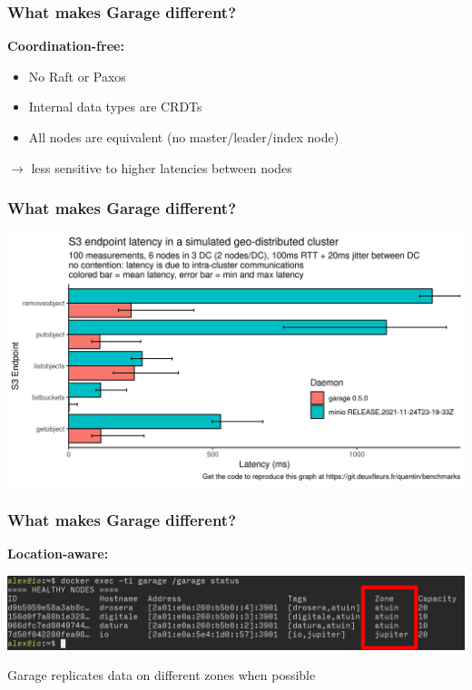 \documentclass[aspectratio=169]{beamer}
\begin{document}
\begin{frame}
	\frametitle{What makes Garage different?}
	\textbf{Coordination-free:}
			\vspace{2em}
	\begin{itemize}
		\item No Raft or Paxos
			\vspace{1em}
		\item Internal data types are CRDTs
			\vspace{1em}
		\item All nodes are equivalent (no master/leader/index node)
	\end{itemize}
			\vspace{2em}
	$\to$ less sensitive to higher latencies between nodes
\end{frame}

\begin{frame}
	\frametitle{What makes Garage different?}
		\begin{center}
			\includegraphics[width=.9\linewidth]{assets/endpoint-latency-dc.png}
		\end{center}
\end{frame}

\begin{frame}
	\frametitle{What makes Garage different?}
	\textbf{Location-aware:}
	\vspace{2em}
		\begin{center}
			\includegraphics[width=\linewidth]{assets/location-aware.png}
		\end{center}
	\vspace{2em}
	Garage replicates data on different zones when possible
\end{frame}
\end{document}
